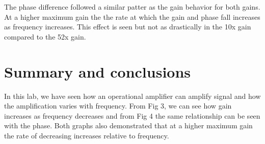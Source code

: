 \documentclass[11pt,letterpaper,onecolumn]{article}
\begin{document}
The phase difference followed a similar patter as the gain behavior for both gains. At a higher maximum gain the the rate at which the gain and phase fall increases as frequency increases. This effect is seen but not as drastically in the 10x gain compared to the 52x gain. 

\section{Summary and conclusions}

In this lab, we have seen how an operational amplifier can amplify signal and how the amplification varies with frequency. From Fig 3, we can see how gain increases as frequency decreases and from Fig 4 the same relationship can be seen with the phase. Both graphs also demonstrated that at a higher maximum gain the rate of decreasing increases relative to frequency. 






\end{document}
